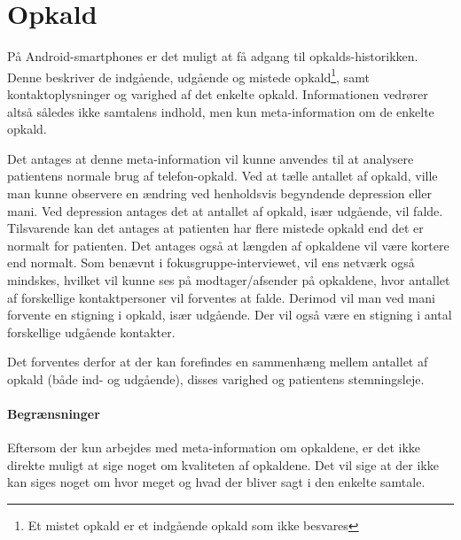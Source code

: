 \section{Opkald}
På Android-smartphones er det muligt at få adgang til opkalds-historikken.
Denne beskriver de indgående, udgående og mistede opkald\footnote{Et mistet opkald er et indgående opkald som ikke besvares}, samt kontaktoplysninger og varighed af det enkelte opkald.
Informationen vedrører altså således ikke samtalens indhold, men kun meta-information om de enkelte opkald.

Det antages at denne meta-information vil kunne anvendes til at analysere patientens normale brug af telefon-opkald.
Ved at tælle antallet af opkald, ville man kunne observere en ændring ved henholdsvis begyndende depression eller mani.
Ved depression antages det at antallet af opkald, især udgående, vil falde.
Tilsvarende kan det antages at patienten har flere mistede opkald end det er normalt for patienten.
Det antages også at længden af opkaldene vil være kortere end normalt.
Som benævnt i fokusgruppe-interviewet, vil ens netværk også mindskes, hvilket vil kunne ses på modtager/afsender på opkaldene, hvor antallet af forskellige kontaktpersoner vil forventes at falde.
Derimod vil man ved mani forvente en stigning i opkald, især udgående.
Der vil også være en stigning i antal forskellige udgående kontakter.

Det forventes derfor at der kan forefindes en sammenhæng mellem antallet af opkald (både ind- og udgående), disses varighed og patientens stemningsleje.

\paragraph{Begrænsninger}
Eftersom der kun arbejdes med meta-information om opkaldene, er det ikke direkte muligt at sige noget om kvaliteten af opkaldene.
Det vil sige at der ikke kan siges noget om hvor meget og hvad der bliver sagt i den enkelte samtale.